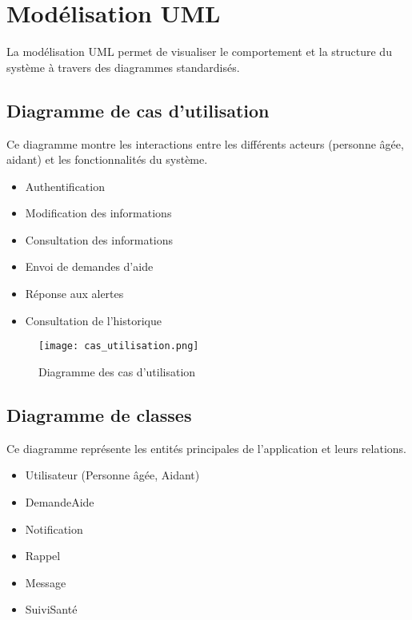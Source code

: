 \documentclass[12pt,a4paper]{report}
\begin{document}
\section{Modélisation UML}

La modélisation UML permet de visualiser le comportement et la structure du système à travers des diagrammes standardisés.

\subsection{Diagramme de cas d’utilisation}

Ce diagramme montre les interactions entre les différents acteurs (personne âgée, aidant) et les fonctionnalités du système.

\begin{itemize}
    \item Authentification
    \item Modification des informations
    \item Consultation des informations
    \item Envoi de demandes d’aide
    \item Réponse aux alertes
    \item Consultation de l’historique
\end{itemize}
 
\begin{figure}[H] 
    \centering
    \texttt{[image: cas\_utilisation.png]}
    \caption{Diagramme des cas d'utilisation}
    \label{fig:uses_case}
\end{figure}


\subsection{Diagramme de classes}

Ce diagramme représente les entités principales de l'application et leurs relations.

\begin{itemize}
    \item Utilisateur (Personne âgée, Aidant)
    \item DemandeAide
    \item Notification
    \item Rappel
    \item Message
    \item SuiviSanté
\end{itemize}
 
\end{document}
